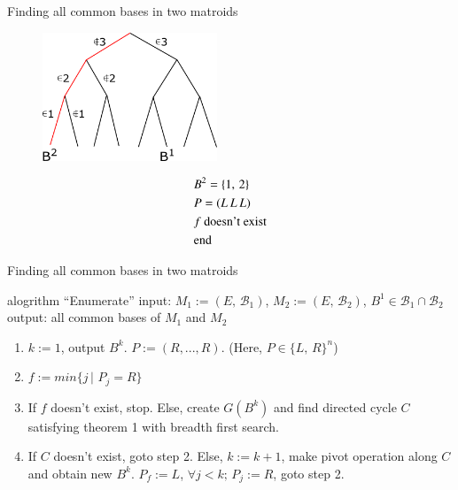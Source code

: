 \documentclass[11pt,xcolor=dvipsnames,table,dvipdfmx]{beamer}
\begin{document}
\begin{frame}{Finding all common bases in two matroids}
 \begin{figure}
  \centering
  \hspace{-0.2cm}
  \includegraphics[width=5.2cm]{text4989-6.png}
 \end{figure}
 \begin{align*}
  &B^2 = \{1,\,2\}\\
  &P = (L\,L\,L)\\
  &f \text{ doesn't exist}\\
  &\text{end}
  \hspace{-0.1cm}
 \end{align*}
\end{frame}

\begin{frame}{Finding all common bases in two matroids}
 \begin{block}{alogrithm ``Enumerate''}
  input: $M_1 := (E,\,\mathcal{B}_1)$, $M_2 := (E,\,\mathcal{B}_2)$, $B^1 \in \mathcal{B}_1 \cap \mathcal{B}_2$\\
  output: all common bases of $M_1$ and $M_2$\\
  \begin{enumerate}
   \item $k := 1$, output $B^k$. $P := (R, ..., R)$. (Here, $P \in \{L,\,R\}^n$)
   \item $f := min\{j\,|\,\,P_j = R\}$
   \item If $f$ doesn't exist, stop. Else, create $G(B^k)$ and find directed cycle $C$ satisfying theorem 1 with breadth first search.
   \item If $C$ doesn't exist, goto step 2. Else, $k := k + 1$, make pivot operation along $C$ and obtain new $B^k$. $P_f := L$, $\forall j < k;\,P_j := R$, goto step 2.
  \end{enumerate}
 \end{block}
\end{frame}
\end{document}
